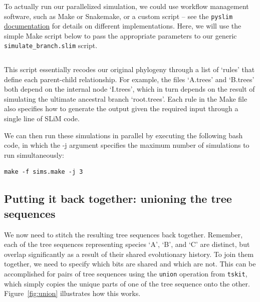 \documentclass[12pt]{article}
\newcommand{\tskit}[0]{\texttt{tskit}\xspace}
\newcommand{\pyslim}[0]{\texttt{pyslim}\xspace}
\begin{document}
To actually run our parallelized simulation, we could use workflow management software, such as Make or Snakemake, or a custom script -- see the \pyslim
\href{https://tskit.dev/pyslim/docs/latest/vignette_parallel_phylo.html}{documentation} for details on different implementations. Here, we will use the simple Make script below to pass
the appropriate parameters to our generic \verb|simulate_branch.slim| script.
%
\inputminted[breaklines,fontsize=\small, breakanywhere=true, breakautoindent=true, linenos, bgcolor=gray!10]{basemake}{code/parallelizing_phylogeny/parallel_sims.make}
%
This script essentially recodes our original phylogeny through a list of `rules' that define each parent-child relationship.
For example, the files `A.trees' and `B.trees' both depend on the internal node `I.trees',
which in turn depends on the result of simulating the ultimate ancestral branch `root.trees'.
Each rule in the Make file also specifies how to generate the output given the required input through a single line of SLiM code.

We can then run these simulations in parallel by executing the following bash code,
in which the -j argument specifies the maximum number of simulations to run simultaneously:
\begin{verbatim}
make -f sims.make -j 3
\end{verbatim}

\subsection{Putting it back together: unioning the tree sequences}

We now need to stitch the resulting tree sequences back together.
Remember, each of the tree sequences representing species `A', `B', and `C'
are distinct, but overlap significantly as a result of their shared evolutionary history.
To join them together, we need to specify which bits are shared and which are not.
This can be accomplished for pairs of tree sequences using the \verb|union| operation from \tskit,
which simply copies the unique parts of one of the tree sequence onto the other.
Figure~\ref{fig:union} illustrates how this works.
\end{document}
